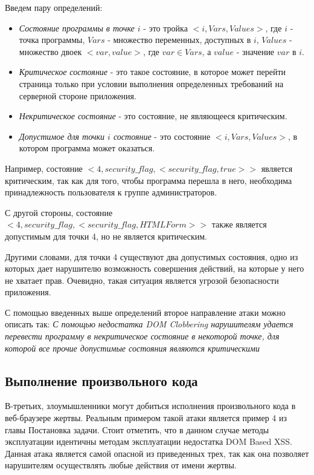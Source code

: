 Введем пару определений:
\begin{itemize}
	\item \textit{Состояние программы в точке $i$} - это тройка $<i, Vars, Values>$, где $i$ - точка программы, $Vars$ - множество переменных, доступных в $i$, $Values$ - множество двоек $<var, value>$, где $var \in Vars$, а $value$ - значение $var$ в $i$.  
	\item \textit{Критическое состояние} - это такое состояние, в которое может перейти страница только при условии выполнения определенных требований на серверной стороне приложения.
	\item \textit{Некритическое состояние} - это состояние, не являющееся критическим.
	\item \textit{Допустимое для точки $i$ состояние} - это состояние $<i, Vars, Values>$, в котором программа может оказаться.
\end{itemize}


Например, состояние $<4, {security\_flag}, {<security\_flag, true>}>$ является критическим, так как для того, чтобы программа перешла в него, необходима принадлежность пользователя к группе администраторов. 

\bigskip
С другой стороны, состояние $<4, {security\_flag}, {<security\_flag, HTMLForm>}>$  также является допустимым для точки 4, но не является критическим.
\bigskip

Другими словами, для точки 4 существуют два допустимых состояния, одно из которых дает нарушителю возможность совершения действий, на которые у него не хватает прав. Очевидно, такая ситуация является угрозой безопасности приложения.


С помощью введенных выше определений второе направление атаки можно описать так: \textit{С помощью недостатка DOM Clobbering нарушителям удается перевести программу в некритическое состояние в некоторой точке, для которой все прочие допустимые состояния являются критическими}

\subsection{Выполнение произвольного кода}
В-третьих, злоумышленники могут добиться исполнения произвольного кода в веб-браузере жертвы. Реальным примером такой атаки является пример 4 из главы Постановка задачи. Стоит отметить, что в данном случае методы эксплуатации идентичны методам эксплуатации недостатка DOM Based XSS. Данная атака является самой опасной из приведенных трех, так как она позволяет нарушителям осуществлять любые действия от имени жертвы.